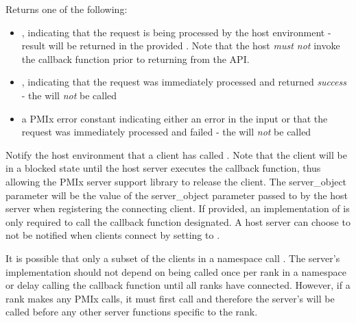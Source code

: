 \begin{arglist}
\end{arglist}

Returns one of the following:

\begin{itemize}
    \item {}, indicating that the request is being processed by the host environment - result will be returned in the provided . Note that the host \emph{must not} invoke the callback function prior to returning from the \ac{API}.
    \item {}, indicating that the request was immediately processed and returned \textit{success} - the  will \textit{not} be called
    \item a PMIx error constant indicating either an error in the input or that the request was immediately processed and failed - the  will \textit{not} be called
\end{itemize}

\descr

Notify the host environment that a client has called .
Note that the client will be in a blocked state until the host server executes the callback function, thus allowing the \ac{PMIx} server support library to release
the client.
The server_object parameter will be the value of the server_object parameter passed to
 by the host server when registering the connecting client.  If provided, an implementation of 
is only required to
call the callback function designated.  A host server can choose to not be notified when clients connect by setting  to .

It is possible that only a subset of the clients in a namespace call .   The server's  implementation
should not depend on being called once per rank in a namespace or delay calling the callback function until all ranks have connected.
However, if a rank makes any \ac{PMIx} calls, it must first call  and
therefore the server's  will be called before any other server functions specific to the rank.

